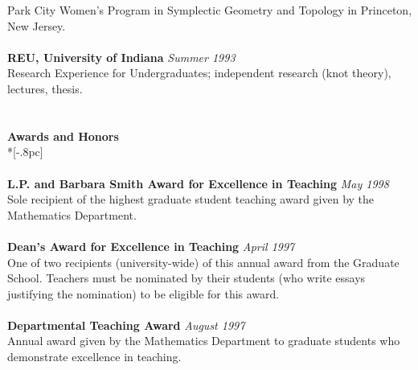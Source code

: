 Park City Women's Program in Symplectic Geometry and Topology in
Princeton, New Jersey.\\
\\
{\bf REU, University of Indiana} \hfill {\it Summer 1993\/} \\
Research Experience for Undergraduates; independent research (knot 
theory), lectures, thesis. \\
\\
\\
{\large \bf Awards and Honors} \\*[-.8pc]
\underline{\hspace{6in}} \\
\\
{\bf L.P. and Barbara Smith Award for Excellence in Teaching} \hfill {\it May 1998\/} \\
Sole recipient of the highest graduate student teaching award given
by the Mathematics Department. \\
\\
{\bf Dean's Award for Excellence in Teaching} \hfill {\it April 1997\/} \\
One of two recipients (university-wide) of this annual award from 
the Graduate School.  Teachers must be nominated by their students
(who write essays justifying the nomination) to be eligible for this
award. \\
\\
{\bf Departmental Teaching Award} \hfill {\it August 1997\/} \\
Annual award given by the Mathematics Department to graduate students
who demonstrate excellence in teaching. \\





